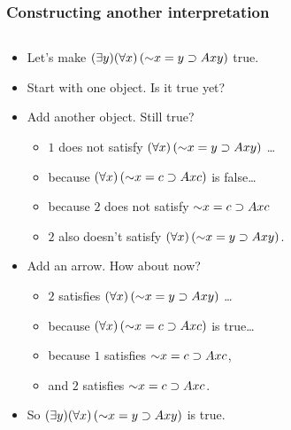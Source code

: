 \begin{frame}
  \frametitle{Constructing another interpretation}
  \begin{columns}
    \begin{column}{.7\textwidth}
  \begin{itemize}[<+->]
    \item Let's make $\qt{\exists}{y}\qt{\forall}{x}\,(\lnot x=y \to
    A\qr{x}{y})$ true.
    \item Start with one object. Is it true yet? 
    \item Add another object. Still true? 
    \begin{itemize}
      \item $1$ does not satisfy $\qt{\forall}{x}\,(\lnot x=y \to
      A\qr{x}{y})$ \dots
      \item because $\qt{\forall}{x}\,(\lnot x=c \to
      A\qr{x}{c})$ is false\dots
      \item because $2$ does not satisfy $\lnot x=c \to
      A\qr{x}{c}$
      \item $2$ also doesn't satisfy $\qt{\forall}{x}\,(\lnot x=y \to
      A\qr{x}{y})$.
    \end{itemize}
    \item Add an arrow. How about now?
    \begin{itemize}
      \item $2$ satisfies $\qt{\forall}{x}\,(\lnot x=y \to
      A\qr{x}{y})$ \dots
      \item because $\qt{\forall}{x}\,(\lnot x=c \to
      A\qr{x}{c})$ is true\dots
      \item because $1$ satisfies $\lnot x=c \to
      A\qr{x}{c}$,
      \item and $2$ satisfies $\lnot x=c \to
      A\qr{x}{c}$.
    \end{itemize}
    \item So $\qt{\exists}{y}\qt{\forall}{x}\,(\lnot x=y \to
    A\qr{x}{y})$ is true.
  \end{itemize}
\end{column}
  \begin{column}{.3\textwidth}
\end{column}
\end{columns}
\end{frame}

